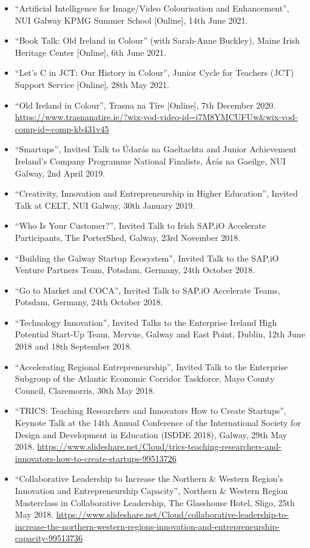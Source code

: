 \documentclass[10pt,a4paper]{res} %
\begin{document}
\begin{resume}
\begin{itemize}
\item ``Artificial Intelligence for Image/Video Colourisation and Enhancement'', NUI Galway KPMG Summer School [Online], 14th June 2021.
\item ``Book Talk: Old Ireland in Colour'' (with Sarah-Anne Buckley), Maine Irish Heritage Center [Online], 6th June 2021.
\item ``Let's C in JCT: Our History in Colour'', Junior Cycle for Teachers (JCT) Support Service [Online], 28th May 2021.
\item ``Old Ireland in Colour'', Trasna na T\'{i}re [Online], 7th December 2020. \url{https://www.trasnanatire.ie/?wix-vod-video-id=i7M8YMCUFUw&wix-vod-comp-id=comp-kb431v45}
\item ``Smartups'', Invited Talk to \'{U}dar\'{a}s na Gaeltachta and Junior Achievement Ireland's Company Programme National Finalists, \'{A}r\'{a}s na Gaeilge, NUI Galway, 2nd April 2019.
\item ``Creativity, Innovation and Entrepreneurship in Higher Education'', Invited Talk at CELT, NUI Galway, 30th January 2019.
\item ``Who Is Your Customer?'', Invited Talk to Irish SAP.iO Accelerate Participants, The PorterShed, Galway, 23rd November 2018.
\item ``Building the Galway Startup Ecosystem'', Invited Talk to the SAP.iO Venture Partners Team, Potsdam, Germany, 24th October 2018.
\item ``Go to Market and COCA'', Invited Talk to SAP.iO Accelerate Teams, Potsdam, Germany, 24th October 2018.
\item ``Technology Innovation'', Invited Talks to the Enterprise Ireland High Potential Start-Up Team, Mervue, Galway and East Point, Dublin, 12th June 2018 and 18th September 2018.
\item ``Accelerating Regional Entrepreneurship'', Invited Talk to the Enterprise Subgroup of the Atlantic Economic Corridor Taskforce, Mayo County Council, Claremorris, 30th May 2018.
\item ``TRICS: Teaching Researchers and Innovators How to Create Startups'', Keynote Talk at the 14th Annual Conference of the International Society for Design and Development in Education (ISDDE 2018), Galway, 29th May 2018. \url{https://www.slideshare.net/Cloud/trics-teaching-researchers-and-innovators-how-to-create-startups-99513726}
\item ``Collaborative Leadership to Increase the Northern \& Western Region's Innovation and Entrepreneurship Capacity'', Northern \& Western Region Masterclass in Collaborative Leadership, The Glasshouse Hotel, Sligo, 25th May 2018. \url{https://www.slideshare.net/Cloud/collaborative-leadership-to-increase-the-northern-western-regions-innovation-and-entrepreneurship-capacity-99513736}

\end{itemize}
\end{resume}
\end{document}
